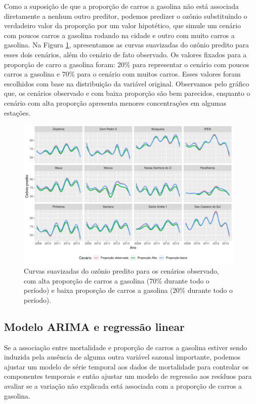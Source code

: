 Como a suposição de que a proporção de carros a gasolina não está associada diretamente a nenhum outro preditor, podemos predizer o ozônio substituindo o verdadeiro valor da proporção por um valor hipotético, que simule um cenário com poucos carros a gasolina rodando na cidade e outro com muito carros a gasolina. Na Figura \ref{fig:cap-comb-random-forest-cenarios}, apresentamos as curvas suavizadas do ozônio predito para esses dois cenários, além do cenário de fato observado. Os valores fixados para a proporção de carro a gasolina foram: 20\% para representar o cenário com poucos carros a gasolina e 70\% para o cenário com muitos carros. Esses valores foram escolhidos com base na distribuição da variável original. Observamos pelo gráfico que, os cenários observado e com baixa proporção são bem parecidos, enquanto o cenário com alta proporção apresenta menores concentrações em algumas estações.

\begin{figure}[h!]
	\centering
	\includegraphics[width=0.7\linewidth]{figuras/cap-comb-random-forest-cenarios.pdf}
	\caption{Curvas suavizadas do ozônio predito para os cenários observado, com alta proporção de carros a gasolina (70\% durante todo o período) e baixa proporção de carros a gasolina (20\% durante todo o período).}
	\label{fig:cap-comb-random-forest-cenarios}
\end{figure}


\subsection{Modelo ARIMA e regressão linear}
\label{sec:mort-arima}

Se a associação entre mortalidade e proporção de carros a gasolina estiver sendo induzida pela ausência de alguma outra variável sazonal importante, podemos ajustar um modelo de série temporal aos dados de mortalidade para controlar os componentes temporais e então ajustar um modelo de regressão aos resíduos para avaliar se a variação não explicada está associada com a proporção de carros a gasolina.

